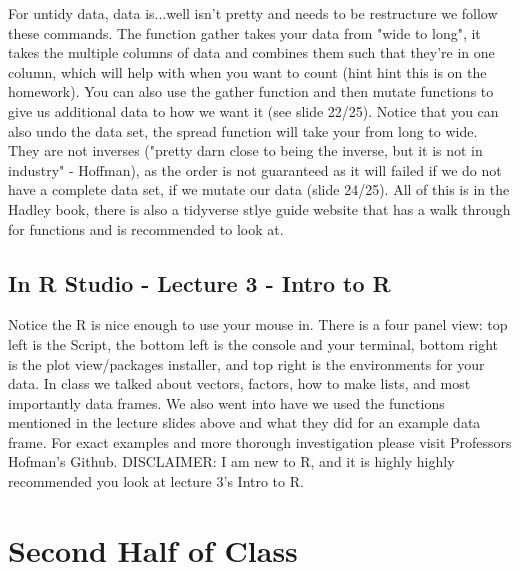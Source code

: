 For untidy data, data is...well isn't pretty and needs to be restructure we follow these commands. The function gather takes your data from "wide to long", it takes the multiple columns of data and combines them such that they're in one column, which will help with when you want to count (hint hint this is on the homework). You can also use the gather function and then mutate functions to give us additional data to how we want it (see slide 22/25). Notice that you can also undo the data set, the spread function will take your from long to wide. They are not inverses ("pretty darn close to being the inverse, but it is not in industry" - Hoffman), as the order is not guaranteed as it will failed if we do not have a complete data set, if we mutate our data  (slide 24/25). All of this is in the Hadley book, there is also a tidyverse stlye guide website that has a walk through for functions and is recommended to look at. 

\subsection{In R Studio - Lecture 3 - Intro to R}
Notice the R is nice enough to use your mouse in. There is a four panel view: top left is the Script, the bottom left is the console and your terminal, bottom right is the plot view/packages installer, and top right is the environments for your data. In class we talked about vectors, factors, how to make lists, and most importantly data frames. We also went into have we used the functions mentioned in the lecture slides above and what they did for an example data frame. For exact examples and more thorough investigation please visit Professors Hofman's Github. 
DISCLAIMER: I am new to R, and it is highly highly recommended you look at lecture 3's Intro to R. 

\section{Second Half of Class}
